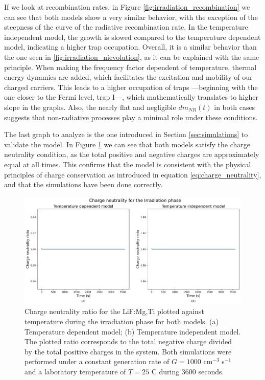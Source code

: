 \vspace{10pt}

If we look at recombination rates, in Figure \ref{fig:irradiation_recombination} we can see that both models show a very similar behavior, with the exception of the steepness of the curve of the radiative recombination rate. In the temperature independent model, the growth is slowed compared to the temperature dependent model, indicating a higher trap occupation. Overall, it is a similar behavior than the one seen in \ref{fig:irradiation_nievolution}, as it can be explained with the same principle. When making the frequency factor dependent of temperature, thermal energy dynamics are added, which facilitates the excitation and mobility of our charged carriers. This leads to a higher occupation of traps ---beginning with the one closer to the Fermi level, trap I---, which mathematically translates to higher slope in the graphs. 
Also, the nearly flat and negligible $dm_{NR}(t)$ in both cases suggests that non-radiative processes play a minimal role under these conditions. %

\vspace{10pt}

The last graph to analyze is the one introduced in Section \ref{sec:simulations} to validate the model. In Figure \ref{fig:irradiation_chneutrality} we can see that both models satisfy the charge neutrality condition, as the total positive and negative charges are approximately equal at all times. This confirms that the model is consistent with the physical principles of charge conservation as introduced in equation \ref{eq:charge_neutrality}, and that the simulations have been done correctly.

\begin{figure}
    \centering
    \includegraphics[width=\textwidth]{Images/Irradiation Charge neutrality.png}
    \caption[Charge neutrality ratio evolution during the irradiation phase for both models.]{Charge neutrality ratio for the LiF:Mg,Ti plotted against temperature during the irradiation phase for both models. (a) Temperature dependent model; (b) Temperature independent model. The plotted ratio corresponds to the total negative charge divided by the total positive charges in the system. Both simulations were performed under a constant generation rate of $G = 1000$ cm$^{-3}$ s$^{-1}$ and a laboratory temperature of $T = 25$ \textdegree C during 3600 seconds.}
    \label{fig:irradiation_chneutrality}
\end{figure}

